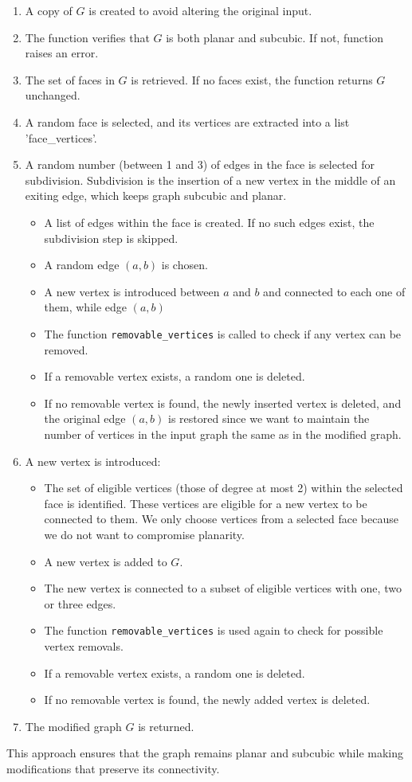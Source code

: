 \documentclass[12pt,a4paper]{amsart}
\theoremstyle{definition}
\theoremstyle{plain}
\begin{document}
\begin{enumerate}
    \item A copy of \( G \) is created to avoid altering the original input.
    \item The function verifies that \( G \) is both planar and subcubic. If not, function raises an error.
    \item The set of faces in \( G \) is retrieved. If no faces exist, the function returns \( G \) unchanged.
    \item A random face is selected, and its vertices are extracted into a list \\
    'face\_vertices'.
    \item A random number (between 1 and 3) of edges in the face is selected for subdivision. Subdivision is the insertion 
    of a new vertex in the middle of an exiting edge, which keeps graph subcubic and planar.
    \begin{itemize}
        \item A list of edges within the face is created. If no such edges exist, the subdivision step is skipped.
        \item A random edge \( (a, b) \) is chosen.
        \item A new vertex is introduced between \( a \) and \( b \) and connected to each one of them, while edge 
        \( (a, b) \) 
        \item The function \texttt{removable\_vertices} is called to check if any vertex can be removed.
        \item If a removable vertex exists, a random one is deleted.
        \item If no removable vertex is found, the newly inserted vertex is deleted, and the original edge \( (a, b) \) 
        is restored since we want to maintain the number of vertices in the input graph the same as in the modified graph.
    \end{itemize}
    \item A new vertex is introduced:
    \begin{itemize}
        \item The set of eligible vertices (those of degree at most 2) within the selected face is identified. These 
        vertices are eligible for a new vertex to be connected to them. We only choose vertices from a selected face
        because we do not want to compromise planarity.
        \item A new vertex is added to \( G \).
        \item The new vertex is connected to a subset of eligible vertices with one, two or three edges.
        \item The function \texttt{removable\_vertices} is used again to check for possible vertex removals.
        \item If a removable vertex exists, a random one is deleted.
        \item If no removable vertex is found, the newly added vertex is deleted.
    \end{itemize}
    \item The modified graph \( G \) is returned.
\end{enumerate}

This approach ensures that the graph remains planar and subcubic while making modifications that preserve its connectivity.
\end{document}
